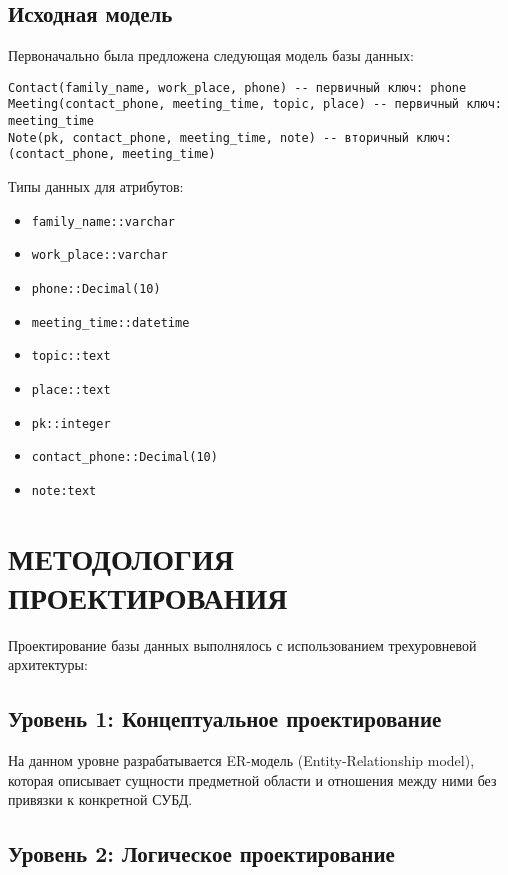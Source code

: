 \documentclass[14pt]{extarticle}
\begin{document}
\subsection{Исходная модель}

Первоначально была предложена следующая модель базы данных:

\begin{verbatim}
Contact(family_name, work_place, phone) -- первичный ключ: phone
Meeting(contact_phone, meeting_time, topic, place) -- первичный ключ: meeting_time
Note(pk, contact_phone, meeting_time, note) -- вторичный ключ: (contact_phone, meeting_time)
\end{verbatim}

Типы данных для атрибутов:
\begin{itemize}
    \item \texttt{family\_name::varchar}
    \item \texttt{work\_place::varchar}
    \item \texttt{phone::Decimal(10)}
    \item \texttt{meeting\_time::datetime}
    \item \texttt{topic::text}
    \item \texttt{place::text}
    \item \texttt{pk::integer}
    \item \texttt{contact\_phone::Decimal(10)}
    \item \texttt{note:text}
\end{itemize}

\section{МЕТОДОЛОГИЯ ПРОЕКТИРОВАНИЯ}

Проектирование базы данных выполнялось с использованием трехуровневой архитектуры:

\subsection{Уровень 1: Концептуальное проектирование}

На данном уровне разрабатывается ER-модель (Entity-Relationship model), которая описывает сущности предметной области и отношения между ними без привязки к конкретной СУБД.

\subsection{Уровень 2: Логическое проектирование}
\end{document}
